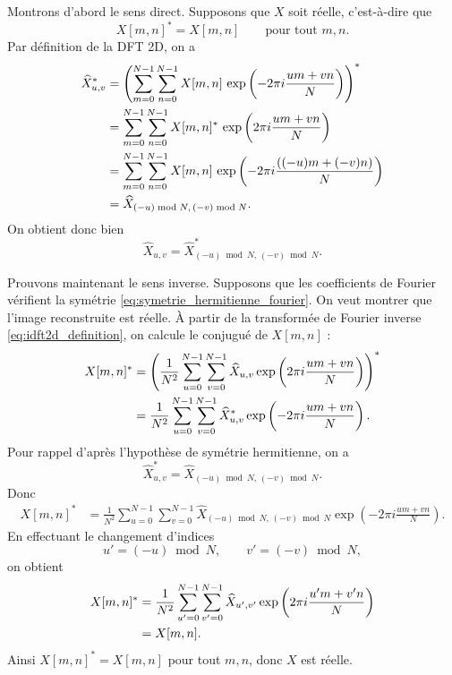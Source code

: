 Montrons d'abord le sens direct. Supposons que $X$ soit réelle, c'est-à-dire que
\[
    X[m,n]^* = X[m,n]
    \qquad
    \text{pour tout } m,n.
\]
Par définition de la DFT 2D, on a
\begin{align*}
    \widehat{X}^{*}_{u,v}
    &=
    \left(
        \sum_{m=0}^{N-1}\sum_{n=0}^{N-1}
        X[m,n]\,
        \exp\left(-2\pi i\frac{um+vn}{N}\right)
    \right)^* \notag \\
    &=
    \sum_{m=0}^{N-1}\sum_{n=0}^{N-1}
    X[m,n]^*\,
    \exp\left(2\pi i\frac{um+vn}{N}\right) \notag \\
    &=
    \sum_{m=0}^{N-1}\sum_{n=0}^{N-1}
    X[m,n]\,
    \exp\left(-2\pi i\frac{((-u)m+(-v)n)}{N}\right) \notag \\
    &=
    \widehat{X}_{(-u)\bmod N,\,(-v)\bmod N}.
\end{align*}
On obtient donc bien
\[
    \widehat{X}_{u,v}
    =
    \widehat{X}^{*}_{(-u)\bmod N,\,(-v)\bmod N}.
\]

Prouvons maintenant le sens inverse. Supposons que les coefficients de Fourier vérifient la symétrie
\eqref{eq:symetrie_hermitienne_fourier}. On veut montrer que l'image reconstruite est réelle.
À partir de la transformée de Fourier inverse \eqref{eq:idft2d_definition}, on calcule le conjugué
de $X[m,n]$ :
\begin{align*}
    X[m,n]^*
    &=
    \left(
        \frac{1}{N^2}
        \sum_{u=0}^{N-1}\sum_{v=0}^{N-1}
        \widehat{X}_{u,v}
        \exp\left(2\pi i\frac{um+vn}{N}\right)
    \right)^* \notag \\
    &=
    \frac{1}{N^2}
    \sum_{u=0}^{N-1}\sum_{v=0}^{N-1}
    \widehat{X}^{*}_{u,v}
    \exp\left(-2\pi i\frac{um+vn}{N}\right).
\end{align*}
Pour rappel d'après l'hypothèse de symétrie hermitienne, on a
\[
    \widehat{X}^{*}_{u,v}
    =
    \widehat{X}_{(-u)\bmod N,\,(-v)\bmod N}.
\]
Donc
\begin{align*}
    X[m,n]^*
    &=
    \frac{1}{N^2}
    \sum_{u=0}^{N-1}\sum_{v=0}^{N-1}
    \widehat{X}_{(-u)\bmod N,\,(-v)\bmod N}
    \exp\left(-2\pi i\frac{um+vn}{N}\right).
\end{align*}
En effectuant le changement d'indices
\[
    u' = (-u)\bmod N,
    \qquad
    v' = (-v)\bmod N,
\]
on obtient
\begin{align*}
    X[m,n]^*
    &=
    \frac{1}{N^2}
    \sum_{u'=0}^{N-1}\sum_{v'=0}^{N-1}
    \widehat{X}_{u',v'}
    \exp\left(2\pi i\frac{u'm+v'n}{N}\right) \notag \\
    &=
    X[m,n].
\end{align*}
Ainsi $X[m,n]^*=X[m,n]$ pour tout $m,n$, donc $X$ est réelle.

